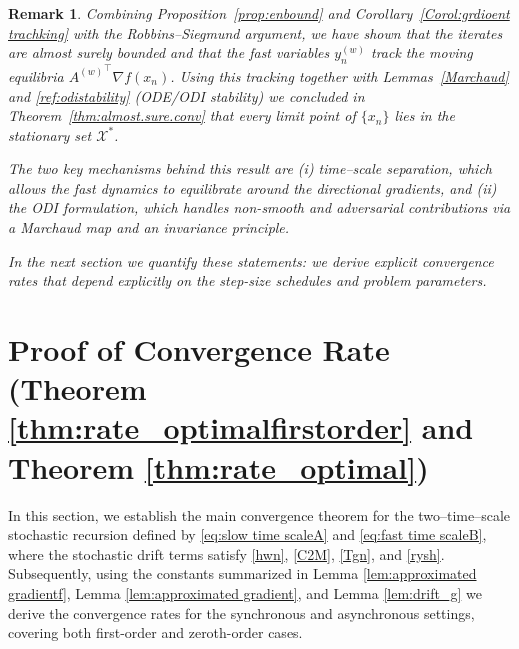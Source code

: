 \documentclass{article}
\newtheorem{remark}[theorem]{Remark}
\begin{document}
\begin{remark}
Combining Proposition~\ref{prop:enbound} and Corollary~\ref{Corol:grdioent trachking} with the Robbins--Siegmund argument, we have shown that the iterates are almost surely bounded and that the fast variables \(y_n^{(w)}\) track the moving equilibria \({A^{(w)}}^\top\nabla f(x_n)\).  Using this tracking together with Lemmas~\ref{Marchaud} and \ref{ref:odistability} (ODE/ODI stability) we concluded in Theorem~\ref{thm:almost.sure.conv} that every limit point of \(\{x_n\}\) lies in the stationary set \(\mathcal{X}^\ast\).  

The two key mechanisms behind this result are (i) time--scale separation, which allows the fast dynamics to equilibrate around the directional gradients, and (ii) the ODI formulation, which handles non-smooth and adversarial contributions via a Marchaud map and an invariance principle.  

In the next section we quantify these statements: we derive explicit  convergence rates that depend explicitly on the step-size schedules and problem parameters.
\end{remark}




\section{Proof of Convergence Rate (Theorem \ref{thm:rate_optimalfirstorder} and Theorem \ref{thm:rate_optimal})}

In this section, we establish the main convergence theorem for the two--time--scale stochastic recursion defined by \eqref{eq:slow time scaleA} and \eqref{eq:fast time scaleB}, where the stochastic drift terms satisfy \eqref{hwn}, \eqref{C2M}, \eqref{Tgn}, and \eqref{rysh}. Subsequently, using the constants summarized in Lemma \ref{lem:approximated gradientf}, Lemma \ref{lem:approximated gradient}, and Lemma \ref{lem:drift_g} we derive the convergence rates for the synchronous and asynchronous settings, covering both first-order and zeroth-order cases.
\end{document}
